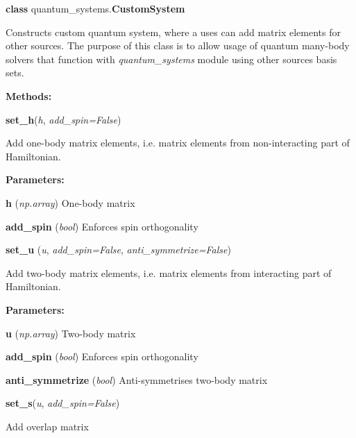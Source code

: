 \begin{tcolorbox}
    {\selectfont
    \textbf{class} quantum\_systems.\textbf{CustomSystem}

    \vspace{1em} 
    Constructs custom quantum system, where a uses can add matrix elements
    for other sources. The purpose of this class is to allow usage of 
    quantum many-body solvers that function with \emph{quantum\_systems} 
    module using other sources basis sets.

    \vspace{1em}
    \textbf{Methods:}

    \hspace{2em} \textbf{set\_h}(\emph{h}, \emph{add\_spin=False})
    \begin{adjustwidth}{4em}{}
        Add one-body matrix elements, i.e. matrix elements from non-interacting 
        part of Hamiltonian.

        \textbf{Parameters:}

        \hspace{1.5em} \textbf{h} (\emph{np.array}) One-body matrix

        \hspace{1.5em} \textbf{add\_spin} (\emph{bool}) Enforces spin orthogonality

    \end{adjustwidth}

    \hspace{2em} \textbf{set\_u}
        (\emph{u}, \emph{add\_spin=False}, \emph{anti\_symmetrize=False})
    \begin{adjustwidth}{4em}{}
        Add two-body matrix elements, i.e. matrix elements from interacting 
        part of Hamiltonian.

        \textbf{Parameters:}

        \hspace{1.5em} \textbf{u} (\emph{np.array}) Two-body matrix

        \hspace{1.5em} \textbf{add\_spin} (\emph{bool}) Enforces spin orthogonality

        \hspace{1.5em} \textbf{anti\_symmetrize} (\emph{bool})
            Anti-symmetrises two-body matrix

    \end{adjustwidth}

    \hspace{2em} \textbf{set\_s}(\emph{u}, \emph{add\_spin=False})
    \begin{adjustwidth}{4em}{}
        Add overlap matrix


\end{adjustwidth}}
\end{tcolorbox}
